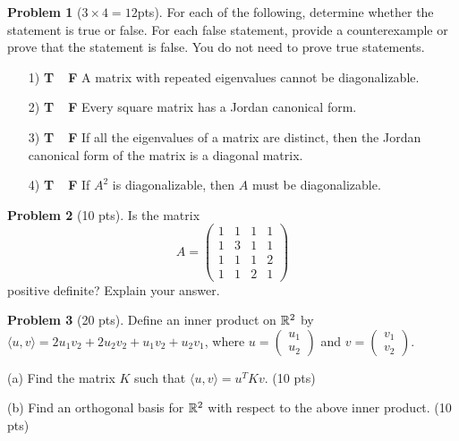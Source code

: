 \documentclass[12pt]{amsart}
\theoremstyle{definition}
\newtheorem{prob}{Problem}
\begin{document}
\begin{prob}[$3\times 4 = 12$pts]For each of the following, determine whether the statement is true or false. For
each false statement, provide a counterexample or prove that the statement is false. You do
not need to prove true statements.	\begin{enumerate}
		\item[1)  {\bf T\ \  F}]\quad   A matrix with repeated eigenvalues cannot be diagonalizable.
		\vspace{5cm}
		
		\item[2)  {\bf T\ \  F}]\quad Every square matrix has a Jordan canonical form.

\vspace{5cm}
		
		\item[3)  {\bf T\ \  F}]\quad If all the eigenvalues of a matrix are distinct, then the Jordan canonical form of the matrix is a diagonal matrix.\vspace{5cm}
		\item[4)  {\bf T\ \  F}]\quad If $A^2$ is diagonalizable, then $A$ must be diagonalizable.	\end{enumerate}
\end{prob}

\newpage

\begin{prob}[10 pts]
	Is the matrix
	$$A=\begin{pmatrix}
		1&1&1&1\\1&3&1&1\\1&1&1&2\\1&1&2&1
	\end{pmatrix}$$
	positive definite? Explain your answer.
\end{prob}

\newpage

\begin{prob}[20 pts]
	Define an inner product on $\mathbb{R}^2$ by $\langle u,v\rangle=2u_1v_2+2u_2v_2+u_1v_2+u_2v_1$, where $u=\begin{pmatrix}
		u_1\\u_2
	\end{pmatrix}$ and $v=\begin{pmatrix}
		v_1\\v_2
	\end{pmatrix}$. 
	
	(a) Find the matrix $K$ such that $\langle u,v\rangle = u^TKv$. (10 pts)\vspace{8cm}
	
		
	(b) Find an orthogonal basis for $\mathbb{R}^2$ with respect to the above inner product. (10 pts) 
	
	
\end{prob}
\end{document}
